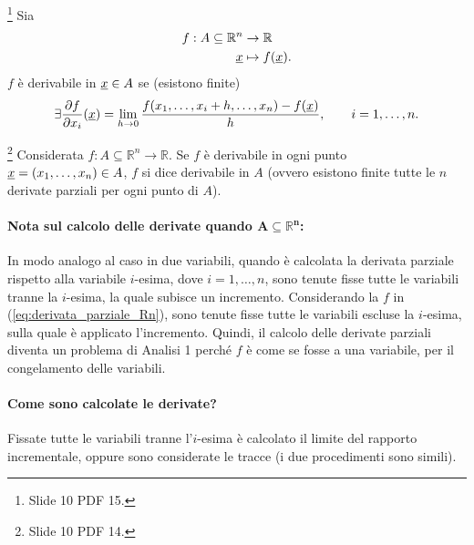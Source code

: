 \begin{definition}\footnote{Slide 10 PDF 15.}
	Sia
	\begin{equation*}
		\begin{aligned}
			f:A\subseteq\mathbb{R}^n & \rightarrow\mathbb{R}\\
			\uline x & \mapsto f(\uline x).
		\end{aligned}
	\end{equation*}
	$f$ è derivabile in $\uline x\in A$ se (esistono finite)
	\begin{equation*}
		\exists\frac{\partial f}{\partial x_i}(\uline x)=\lim\limits_{h\rightarrow 0}\frac{f(x_1,\hdots,x_i+h,\hdots,x_n)-f(\uline x)}{h},\qquad i=1,\hdots, n.
	\end{equation*}
\end{definition}

\begin{definition}[Derivabilità in $A$]\footnote{Slide 10 PDF 14.}
   Considerata $f:A\subseteq\mathbb R^n\rightarrow\mathbb R$. Se $f$ è derivabile in ogni punto $\uline x=(x_1,\hdots,x_n)\in A$, $f$ si dice derivabile in $A$ (ovvero esistono finite tutte le $n$ derivate parziali per ogni punto di $A$).
\end{definition}

\paragraph{Nota sul calcolo delle derivate quando $\boldsymbol{A\subseteq\mathbb{R}^n}$:} In modo analogo al caso in due variabili, quando è calcolata la derivata parziale rispetto alla variabile $i$-esima, dove $i=1,\hdots,n$, sono tenute fisse tutte le variabili tranne la $i$-esima, la quale subisce un incremento. Considerando la $f$ in (\ref{eq:derivata_parziale_Rn}), sono tenute fisse tutte le variabili escluse la $i$-esima, sulla quale è applicato l'incremento. Quindi, il calcolo delle derivate parziali diventa un problema di Analisi 1 perché $f$ è come se fosse a una variabile, per il congelamento delle variabili.

\paragraph{Come sono calcolate le derivate?} Fissate tutte le variabili tranne l'$i$-esima è calcolato il limite del rapporto incrementale, oppure sono considerate le tracce (i due procedimenti sono simili).

